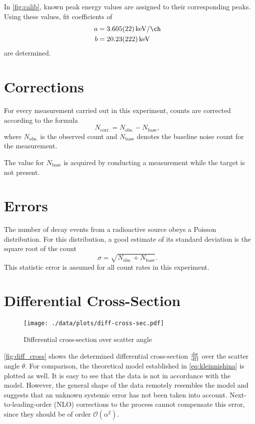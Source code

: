 In \autoref{fig:calib}, known peak energy values are assigned to their corresponding peaks.
Using these values, fit coefficients of
\begin{align*}
	a &= \SI{3.605(22)}{\kilo\eV\per\ch} \\
	b &= \SI{20.23(222)}{\kilo\eV}
\end{align*}
are determined.

\section{Corrections}
For every measurement carried out in this experiment, counts are corrected according to the formula
\begin{equation*}
	N_\text{corr.} = N_\text{obs.} - N_\text{base},
\end{equation*}
where $N_\text{obs.}$ is the observed count and $N_\text{base}$ denotes the baseline noise count for the measurement.

The value for $N_\text{base}$ is acquired by conducting a measurement while the target is not present.

\section{Errors}
The number of decay events from a radioactive source obeys a Poisson distribution.
For this distribution, a good estimate of its standard deviation is the square root of the count
\begin{equation*}
	\sigma = \sqrt{N_\text{obs.} + N_\text{base}}.
\end{equation*}
This statistic error is assumed for all count rates in this experiment.

\section{Differential Cross-Section}\label{sec:diff_cross_res}
\begin{figure}
	\centering
	\texttt{[image: ./data/plots/diff-cross-sec.pdf]}
	\caption{Differential cross-section over scatter angle}
	\label{fig:diff_cross}
\end{figure}

\autoref{fig:diff_cross} shows the determined differential cross-section $\frac{\text{d}\sigma}{\text{d}\Omega}$ over the scatter angle $\theta$.
For comparison, the theoretical model established in \autoref{eq:kleinnishina} is plotted as well.
It is easy to see that the data is not in accordance with the model.
However, the general shape of the data remotely resembles the model and suggests that an unknown systemic error has not been taken into account.
Next-to-leading-order (NLO) corrections to the process cannot compensate this error, since they should be of order $\mathcal{O}(\alpha^2)$.

